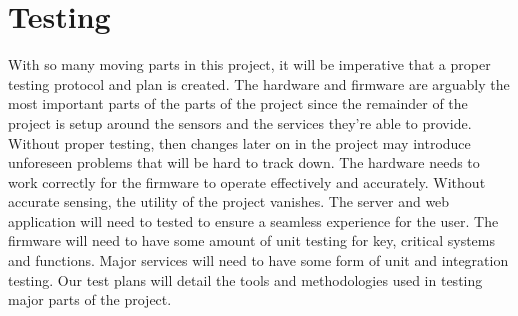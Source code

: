 \section{Testing}
With so many moving parts in this project, it will be imperative that a proper
testing protocol and plan is created. The hardware and firmware are arguably the
most important parts of the parts of the project since the remainder of the
project is setup around the sensors and the services they're able to provide.
Without proper testing, then changes later on in the project may introduce
unforeseen problems that will be hard to track down. The hardware needs to work
correctly for the firmware to operate effectively and accurately. Without
accurate sensing, the utility of the project vanishes. The server and web
application will need to tested to ensure a seamless experience for the user.
The firmware will need to have some amount of unit testing for key, critical
systems and functions. Major services will need to have some form of unit and
integration testing. Our test plans will detail the tools and methodologies used
in testing major parts of the project.

